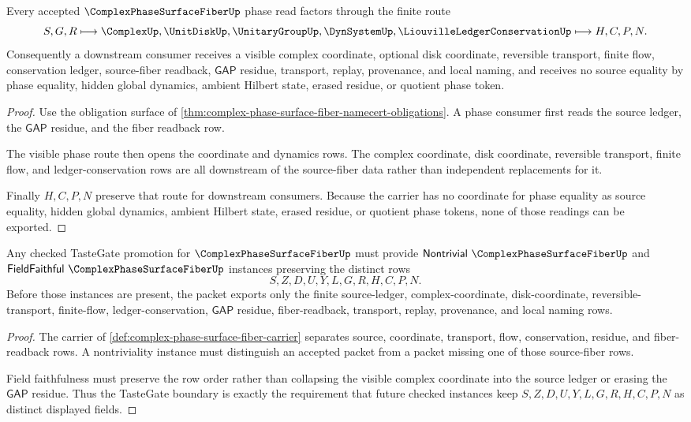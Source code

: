 \begin{theorem}
\label{thm:complex-phase-surface-fiber-readback-discipline}
Every accepted $\ComplexPhaseSurfaceFiberUp$ phase read factors through the finite route
$$
S,G,R
\longmapsto
\ComplexUp,\UnitDiskUp,\UnitaryGroupUp,\DynSystemUp,\LiouvilleLedgerConservationUp
\longmapsto
H,C,P,N .
$$
Consequently a downstream consumer receives a visible complex coordinate, optional disk coordinate, reversible transport, finite flow, conservation ledger, source-fiber readback, $\mathsf{GAP}$ residue, transport, replay, provenance, and local naming, and receives no source equality by phase equality, hidden global dynamics, ambient Hilbert state, erased residue, or quotient phase token.
\end{theorem}
\begin{proof}
Use the obligation surface of \autoref{thm:complex-phase-surface-fiber-namecert-obligations}. A phase consumer first reads the source ledger, the $\mathsf{GAP}$ residue, and the fiber readback row.

The visible phase route then opens the coordinate and dynamics rows. The complex coordinate, disk coordinate, reversible transport, finite flow, and ledger-conservation rows are all downstream of the source-fiber data rather than independent replacements for it.

Finally $H,C,P,N$ preserve that route for downstream consumers. Because the carrier has no coordinate for phase equality as source equality, hidden global dynamics, ambient Hilbert state, erased residue, or quotient phase tokens, none of those readings can be exported.
\end{proof}

\begin{theorem}
\label{thm:complex-phase-surface-fiber-tastegate-boundary}
Any checked TasteGate promotion for $\ComplexPhaseSurfaceFiberUp$ must provide $\mathsf{Nontrivial}\ \ComplexPhaseSurfaceFiberUp$ and $\mathsf{FieldFaithful}\ \ComplexPhaseSurfaceFiberUp$ instances preserving the distinct rows
$$
S,Z,D,U,Y,L,G,R,H,C,P,N .
$$
Before those instances are present, the packet exports only the finite source-ledger, complex-coordinate, disk-coordinate, reversible-transport, finite-flow, ledger-conservation, $\mathsf{GAP}$ residue, fiber-readback, transport, replay, provenance, and local naming rows.
\end{theorem}
\begin{proof}
The carrier of \autoref{def:complex-phase-surface-fiber-carrier} separates source, coordinate, transport, flow, conservation, residue, and fiber-readback rows. A nontriviality instance must distinguish an accepted packet from a packet missing one of those source-fiber rows.

Field faithfulness must preserve the row order rather than collapsing the visible complex coordinate into the source ledger or erasing the $\mathsf{GAP}$ residue. Thus the TasteGate boundary is exactly the requirement that future checked instances keep $S,Z,D,U,Y,L,G,R,H,C,P,N$ as distinct displayed fields.
\end{proof}


